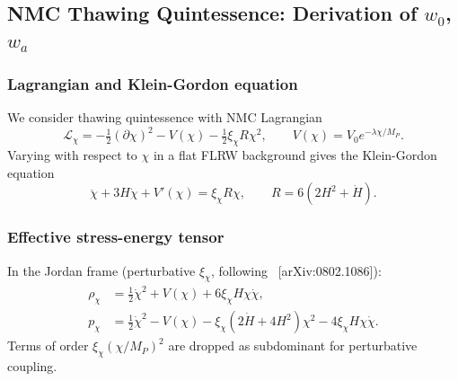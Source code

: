 

\subsection*{NMC Thawing Quintessence: Derivation of $w_0$, $w_a$}

\subsubsection*{Lagrangian and Klein-Gordon equation}

We consider thawing quintessence with NMC Lagrangian
\begin{equation}
    \mathcal{L}_\chi = -\tfrac{1}{2}(\partial\chi)^2 - V(\chi) - \tfrac{1}{2}\xi_\chi R\chi^2,
    \qquad V(\chi) = V_0 e^{-\lambda\chi/M_P}.
\end{equation}
Varying with respect to $\chi$ in a flat FLRW background gives the Klein-Gordon equation
\begin{equation}
    \ddot\chi + 3H\dot\chi + V'(\chi) = \xi_\chi R\chi,
    \qquad R = 6(2H^2 + \dot H).
    \label{eq:KG-NMC}
\end{equation}

\subsubsection*{Effective stress-energy tensor}

In the Jordan frame (perturbative $\xi_\chi$, following
\citealt{Pettorino:2008ez}~[arXiv:0802.1086]):
\begin{align}
    \rho_\chi &= \tfrac{1}{2}\dot\chi^2 + V(\chi) + 6\xi_\chi H\chi\dot\chi, \label{eq:rho-NMC}\\
    p_\chi    &= \tfrac{1}{2}\dot\chi^2 - V(\chi) - \xi_\chi(2\dot H + 4H^2)\chi^2
                 - 4\xi_\chi H\chi\dot\chi. \label{eq:p-NMC}
\end{align}
Terms of order $\xi_\chi(\chi/M_P)^2$ are dropped as subdominant for
perturbative coupling.


